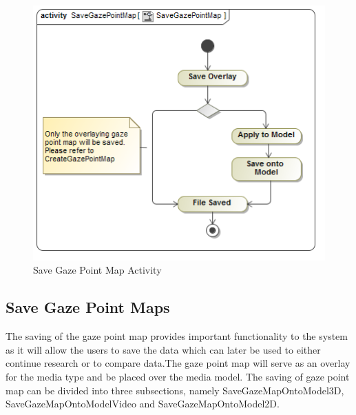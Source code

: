 	\begin{figure}[!ht]
		\centering
		\includegraphics[scale=0.5,width=15cm,keepaspectratio]{Diagrams/Activity_Diagram__SaveGazePointMap__SaveGazePointMap.png}
		\caption{Save Gaze Point Map Activity}
	\end{figure}
	
\subsection{Save Gaze Point Maps}
	The saving of the gaze point map provides important functionality to the system as it will allow the users to save the data which can later be used to either continue research or to compare data.The gaze point map will serve as an overlay for the media type and be placed over the media model. The saving of gaze point map can be divided into three subsections, namely SaveGazeMapOntoModel3D, SaveGazeMapOntoModelVideo and SaveGazeMapOntoModel2D.
	\newline
	
